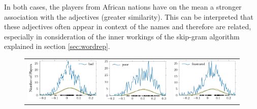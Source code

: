 \documentclass[10pt, a4paper]{UUThesisTemplate}
\begin{document}
In both cases, the players from African nations have on the mean a stronger association with the adjectives (greater similarity). This can be interpreted that these adjectives often appear in context of the names and therefore are related, especially in consideration of the inner workings of the skip-gram algorithm explained in section \ref{sec:wordrep}. 

\begin{figure}
\begin{tabular}{c c c}
\hspace{-2cm}\includegraphics{figures/bad_distribution.pdf} & \includegraphics{figures/poor_distribution.pdf} & \includegraphics{figures/frustated_distribution.pdf}\\

\end{tabular}
\end{figure}
\end{document}
